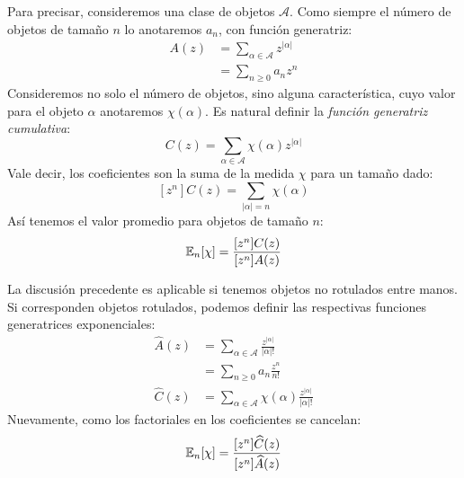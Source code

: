   Para precisar,
  consideremos una clase de objetos \(\mathscr{A}\).
  Como siempre el número de objetos de tamaño \(n\)
  lo anotaremos \(a_n\),
  con función generatriz:
  \begin{align}
    A(z)
      &= \sum_{\alpha \in \mathscr{A}} z^{\lvert \alpha \rvert}
            \label{eq:A-def} \\
      &= \sum_{n \ge 0} a_n z^n
            \label{eq:A-an}
  \end{align}
  Consideremos no solo el número de objetos,
  sino alguna característica,
  cuyo valor para el objeto \(\alpha\) anotaremos \(\chi(\alpha)\).
  Es natural definir la \emph{función generatriz cumulativa}:
  \begin{equation}
    \label{eq:cogf-def}
    C(z)
      = \sum_{\alpha \in \mathscr{A}} \chi(\alpha) z^{\lvert \alpha \rvert}
  \end{equation}
  Vale decir,
  los coeficientes son la suma de la medida \(\chi\)
  para un tamaño dado:
  \begin{equation}
    \label{eq:cogf-coefficient}
    [z^n] C(z)
      = \sum_{\lvert \alpha \rvert = n} \chi(\alpha)
  \end{equation}
  Así tenemos el valor promedio para objetos de tamaño \(n\):
  \begin{equation}
    \label{eq:chi-expected}
    \operatorname{\mathbb{E}}_n[\chi]
      = \frac{[z^n] C(z)}{[z^n] A(z)}
  \end{equation}

  La discusión precedente es aplicable
  si tenemos objetos no rotulados entre manos.
  Si corresponden objetos rotulados,
  podemos definir las respectivas funciones generatrices exponenciales:
  \begin{align}
    \widehat{A}(z)
      &= \sum_{\alpha \in \mathscr{A}}
           \frac{z^{\lvert \alpha \rvert}}{\lvert \alpha \rvert !}
                \label{eq:Ahat-def} \\
      &= \sum_{n \ge 0} a_n \frac{z^n}{n!}
                \label{eq:Ahat-an} \\
    \widehat{C}(z)
      &= \sum_{\alpha \in \mathscr{A}}
           \chi(\alpha) \frac{z^{\lvert \alpha \rvert}}{\lvert \alpha \rvert !}
                \label{eq:Chat-def}
  \end{align}
  Nuevamente,
  como los factoriales en los coeficientes se cancelan:
  \begin{equation}
    \label{eq:chi-expected-hat}
    \operatorname{\mathbb{E}}_n[\chi]
      = \frac{[z^n] \widehat{C}(z)}{[z^n] \widehat{A}(z)}
  \end{equation}

